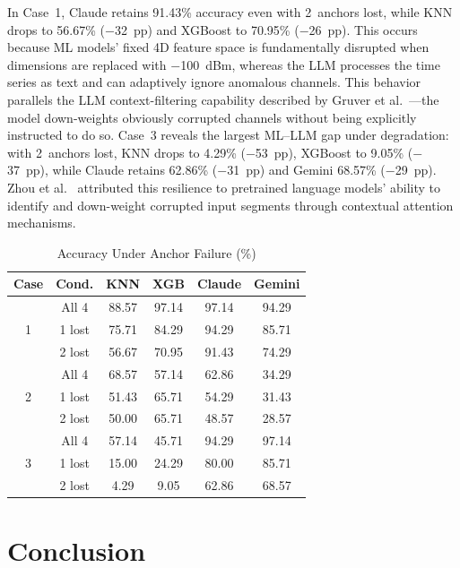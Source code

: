 \documentclass[conference]{IEEEtran}
\begin{document}
In Case~1, Claude retains 91.43\% accuracy even with 2~anchors lost, while KNN drops to 56.67\% ($-$32~pp) and XGBoost to 70.95\% ($-$26~pp). This occurs because ML models' fixed 4D feature space is fundamentally disrupted when dimensions are replaced with $-$100~dBm, whereas the LLM processes the time series as text and can adaptively ignore anomalous channels. This behavior parallels the LLM context-filtering capability described by Gruver et al.~\cite{b8}---the model down-weights obviously corrupted channels without being explicitly instructed to do so. Case~3 reveals the largest ML--LLM gap under degradation: with 2~anchors lost, KNN drops to 4.29\% ($-$53~pp), XGBoost to 9.05\% ($-$37~pp), while Claude retains 62.86\% ($-$31~pp) and Gemini 68.57\% ($-$29~pp). Zhou et al.~\cite{b17} attributed this resilience to pretrained language models' ability to identify and down-weight corrupted input segments through contextual attention mechanisms.

\begin{table}[htbp]
\caption{Accuracy Under Anchor Failure (\%)}
\begin{center}
\begin{tabular}{|c|c|cc|cc|}
\hline
\textbf{Case} & \textbf{Cond.} & \textbf{KNN} & \textbf{XGB} & \textbf{Claude} & \textbf{Gemini} \\
\hline
\multirow{3}{*}{1}
 & All 4  & 88.57 & 97.14 & 97.14 & 94.29 \\
 & 1 lost & 75.71 & 84.29 & 94.29 & 85.71 \\
 & 2 lost & 56.67 & 70.95 & 91.43 & 74.29 \\
\hline
\multirow{3}{*}{2}
 & All 4  & 68.57 & 57.14 & 62.86 & 34.29 \\
 & 1 lost & 51.43 & 65.71 & 54.29 & 31.43 \\
 & 2 lost & 50.00 & 65.71 & 48.57 & 28.57 \\
\hline
\multirow{3}{*}{3}
 & All 4  & 57.14 & 45.71 & 94.29 & 97.14 \\
 & 1 lost & 15.00 & 24.29 & 80.00 & 85.71 \\
 & 2 lost & 4.29  & 9.05  & 62.86 & 68.57 \\
\hline
\end{tabular}
\label{tab:anchor_failure}
\end{center}
\vspace{-4mm}
\end{table}

\section{Conclusion}
\end{document}
